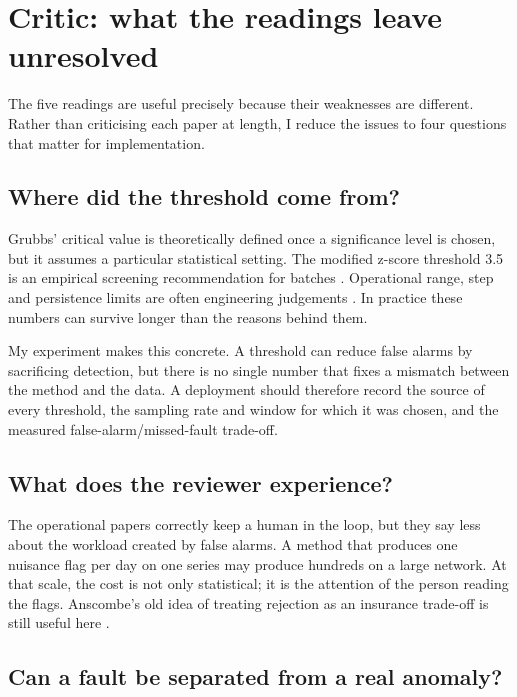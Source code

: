 \clearpage
\section{Critic: what the readings leave unresolved}
\label{sec:critic}

The five readings are useful precisely because their weaknesses are
different. Rather than criticising each paper at length, I reduce the issues
to four questions that matter for implementation.

\subsection{Where did the threshold come from?}

Grubbs' critical value is theoretically defined once a significance level is
chosen, but it assumes a particular statistical setting. The modified
z-score threshold 3.5 is an empirical screening recommendation for batches
\citep{iglewicz1993}. Operational range, step and persistence limits are
often engineering judgements \citep{shafer2000}. In practice these numbers
can survive longer than the reasons behind them.

My experiment makes this concrete. A threshold can reduce false alarms by
sacrificing detection, but there is no single number that fixes a mismatch
between the method and the data. A deployment should therefore record the
source of every threshold, the sampling rate and window for which it was
chosen, and the measured false-alarm/missed-fault trade-off.

\subsection{What does the reviewer experience?}

The operational papers correctly keep a human in the loop, but they say less
about the workload created by false alarms. A method that produces one
nuisance flag per day on one series may produce hundreds on a large network.
At that scale, the cost is not only statistical; it is the attention of the
person reading the flags. Anscombe's old idea of treating rejection as an
insurance trade-off is still useful here \citep{anscombe1960}.

\subsection{Can a fault be separated from a real anomaly?}

